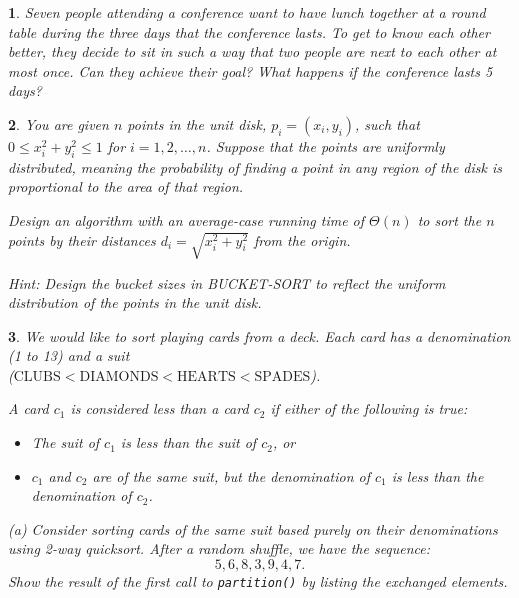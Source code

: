 \documentclass[%
addpoints]{exam}
\theoremstyle{problem}
\newtheorem{p}{}
\begin{document}
\begin{p}
Seven people attending a conference want to have lunch together at a round table during the three days that the conference lasts. To get to know each other better, they decide to sit in such a way that two people are next to each other at most once. Can they achieve their goal? What happens if the conference lasts 5 days?  
\hfill\end{p}

\begin{p}
You are given \( n \) points in the unit disk, \( p_i = (x_i, y_i) \), such that \( 0 \leq x_i^2 + y_i^2 \leq 1 \) for \( i = 1, 2, \dots, n \). Suppose that the points are uniformly distributed, meaning the probability of finding a point in any region of the disk is proportional to the area of that region.  

Design an algorithm with an average-case running time of \( \Theta(n) \) to sort the \( n \) points by their distances \( d_i = \sqrt{x_i^2 + y_i^2} \) from the origin.  

Hint: Design the bucket sizes in BUCKET-SORT to reflect the uniform distribution of the points in the unit disk.  
\hfill\end{p}

\begin{p}
We would like to sort playing cards from a deck. Each card has a denomination (1 to 13) and a suit\\ (\(\text{CLUBS} < \text{DIAMONDS} < \text{HEARTS} < \text{SPADES}\)).  

A card \( c_1 \) is considered less than a card \( c_2 \) if either of the following is true:
\begin{itemize}
    \item The suit of \( c_1 \) is less than the suit of \( c_2 \), or
    \item \( c_1 \) and \( c_2 \) are of the same suit, but the denomination of \( c_1 \) is less than the denomination of \( c_2 \).
\end{itemize}

(a) Consider sorting cards of the same suit based purely on their denominations using 2-way quicksort. After a random shuffle, we have the sequence:  
\[ 5, 6, 8, 3, 9, 4, 7. \]  
Show the result of the first call to \texttt{partition()} by listing the exchanged elements.  
\hfill\end{p}

\newpage
\end{document}
